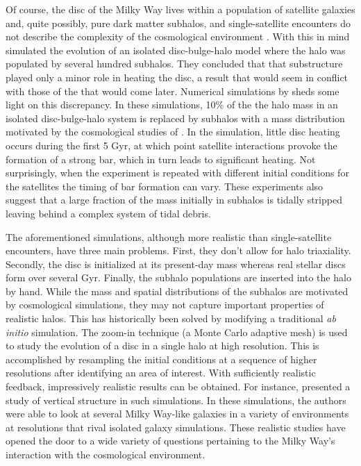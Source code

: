 
Of course, the disc of the Milky Way lives within a population of satellite galaxies and, quite possibly, pure dark matter subhalos, and single-satellite encounters do not describe the complexity of the cosmological environment \citep{Klypin1999,mooresubhalos,springel2008}.  With this in mind \citet{Font2001} simulated the evolution of an isolated disc-bulge-halo model where the halo was populated by several hundred subhalos.  They concluded that that substructure played only a minor role in heating the disc, a result that would seem in conflict with those of the \citet{kazantzidis2008} that would come later.  Numerical simulations by \citet{gauthier2006, dubinski2008} sheds some light on this discrepancy.  In these simulations, 10\% of the the halo mass in an isolated disc-bulge-halo system is replaced by subhalos with a mass distribution motivated by the cosmological studies of \citet{gao2004}.  In the \citet{gauthier2006} simulation, little disc heating occurs during the first 5 Gyr, at which point satellite interactions provoke the formation of a strong bar, which in turn leads to significant heating.  Not surprisingly, when the experiment is repeated with different initial conditions for the satellites the timing of bar formation can vary.  These experiments also suggest that a large fraction of the mass initially in subhalos is tidally stripped leaving behind a complex system of tidal debris.

The aforementioned simulations, although more realistic than single-satellite encounters, have three main problems.  First, they don't allow for halo triaxiality.  Secondly, the disc is initialized at its present-day mass whereas real stellar discs form over several Gyr.  Finally, the subhalo populations are inserted into the halo by hand.  While the mass and spatial distributions of the subhalos are motivated by cosmological simulations, they may not capture important properties of realistic halos. This has historically been solved by modifying a traditional \textit{ab initio} simulation. The zoom-in technique (a Monte Carlo adaptive mesh) is used to study the evolution of a disc in a single halo at high resolution.  This is accomplished by resampling the initial conditions at a sequence of higher resolutions after identifying an area of interest. With sufficiently realistic feedback, impressively realistic results can be obtained. For instance, \citet{gomez_2017} presented a study of vertical structure in such simulations. In these simulations, the authors were able to look at several Milky Way-like galaxies in a variety of environments at resolutions that rival isolated galaxy simulations. These realistic studies have opened the door to a wide variety of questions pertaining to the Milky Way's interaction with the cosmological environment.

